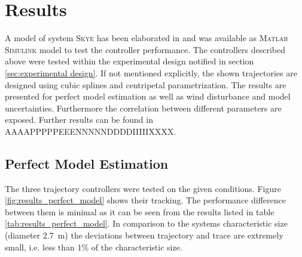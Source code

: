 \section{Results}
\label{sec:results}

A model of system \textsc{Skye} has been elaborated in \cite{weichart} and was available as \textsc{Matlab Simulink} model to test the controller performance. The controllers described above were tested within the experimental design notified in section \ref{sec:experimental design}. If not mentioned explicitly, the shown trajectories are designed using cubic splines and centripetal parametrization. The results are presented for perfect model estimation as well as wind disturbance and model uncertainties. Furthermore the correlation between different parameters are exposed. Further results can be found in AAAAPPPPPEEENNNNNDDDDIIIIIXXXX.

\subsection{Perfect Model Estimation}
\label{sub:results_perfect_model}

The three trajectory controllers were tested on the given conditions. Figure \ref{fig:results_perfect_model} shows their tracking. The performance difference between them is minimal as it can be seen from the results listed in table \ref{tab:results_perfect_model}. In comparison to the systems characteristic size (diameter \SI{2.7}{\meter}) the deviations between trajectory and trace are extremely small, i.e. less than 1\% of the characteristic size. 

